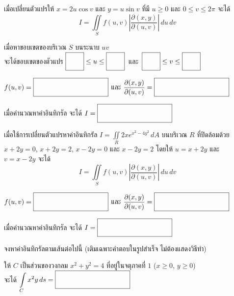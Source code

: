 \documentclass[12pt,final]{novelette} %
\begin{document}
\begin{question}
    \vspace{2em}
    เมื่อเปลี่ยนตัวแปรให้ $x = 2u \cos v$ และ $y = u \sin v$ ที่มี $u \geq 0$ และ $0 \leq v \leq 2\pi$ จะได้
    \[
        I = \iint\limits_S f(u, v) \left|\frac{\partial(x, y)}{\partial(u, v)}\right| \, du \, dv
    \]
    \begin{question}[itemsep=16pt]
        \item {} เมื่อหาขอบเขตของบริเวณ $S$ บนระนาบ $uv$ \\[.5em]
        จะได้ขอบเขตของตัวแปร $\ansboxi{0.7cm} \leq u \leq \ansboxi{0.7cm}$\, และ \,$\ansboxi{0.7cm} \leq v \leq \ansboxi{0.7cm}$

        \item {} $f(u, v) = \ansboxi{3.6cm}$ และ $\dfrac{\partial(x, y)}{\partial(u, v)} = \ansboxi{3.6cm}$

        \item {} เมื่อคำนวณหาค่าอินทิกรัล จะได้ $I = \ansboxi{3.6cm}$
    \end{question}

    \vspace{5.5em}

    \item {} %
     เมื่อใช้การเปลี่ยนตัวแปรหาค่าอินทิกรัล $\displaystyle I = \iint\limits_R 2x e^{x^2 - 4y^2} \, dA$
    บนบริเวณ $R$ ที่ปิดล้อมด้วย $x + 2y = 0$, $x + 2y = 2$, $x - 2y = 0$ และ $x - 2y = 2$
    โดยให้ $u = x + 2y$ และ $v = x - 2y$ จะได้
    \[
        I = \iint\limits_S f(u, v) \left|\frac{\partial(x, y)}{\partial(u, v)}\right| \, du \, dv
    \]
    \begin{question}[itemsep=16pt]
        \item {} $f(u, v) = \ansboxi{3.6cm}$ และ $\dfrac{\partial(x, y)}{\partial(u, v)} = \ansboxi{3.6cm}$

        \item {} เมื่อคำนวณหาค่าอินทิกรัล จะได้ $I = \ansboxi{3.6cm}$
    \end{question}

    \pagebreak

    \item {} %
     จงหาค่าอินทิกรัลตามเส้นต่อไปนี้ (เติมเฉพาะคำตอบในรูปสำเร็จ ไม่ต้องแสดงวิธีทำ)
    \begin{question}[itemsep=2.6cm]
        \item {} ให้ $C$ เป็นส่วนของวงกลม $x^2 + y^2 = 4$ ที่อยู่ในจตุภาคที่ $1$ ($x \geq 0$, $y \geq 0$) \\[.5em]
        จะได้ $\displaystyle \int\limits_C x^2 y \, ds = \ansboxi{3.6cm}$


\end{question}
\end{question}
\end{document}
